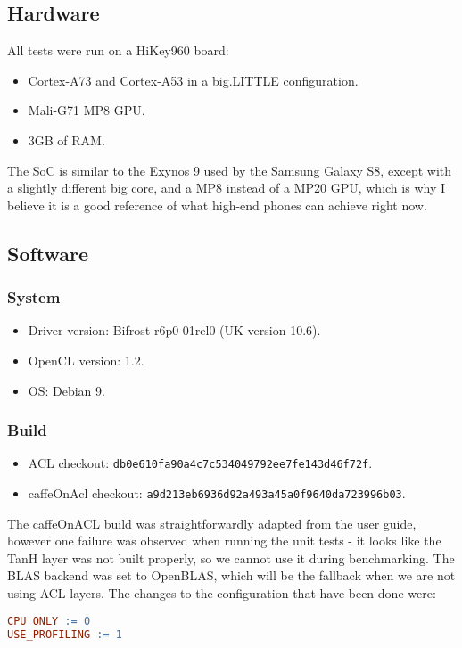 \documentclass[12pt, a4paper, notitlepage]{report}
\begin{document}
\subsection*{Hardware}
All tests were run on a HiKey960 board:
\begin{itemize}
\item Cortex-A73 and Cortex-A53 in a big.LITTLE configuration.
\item Mali-G71 MP8 GPU.
\item 3GB of RAM.
\end{itemize}
The SoC is similar to the Exynos 9 used by the Samsung Galaxy S8, except with a slightly different big core, and a MP8 instead of a MP20 GPU, which is why I believe it is a good reference of what high-end phones can achieve right now.\cite{galaxy}

\subsection*{Software}
\subsubsection*{System}
\begin{itemize}
	\item Driver version: Bifrost r6p0-01rel0 (UK version 10.6).
	\item OpenCL version: 1.2.
	\item OS: Debian 9.
\end{itemize}
\subsubsection*{Build}
\begin{itemize}
	\item ACL checkout: \texttt{db0e610fa90a4c7c534049792ee7fe143d46f72f}.
	\item caffeOnAcl checkout: \texttt{a9d213eb6936d92a493a45a0f9640da723996b03}.
\end{itemize}
The caffeOnACL build was straightforwardly adapted from the user guide, however one failure was observed when running the unit tests - it looks like the TanH layer was not built properly, so we cannot use it during benchmarking. The BLAS backend was set to OpenBLAS, which will be the fallback when we are not using ACL layers. The changes to the configuration that have been done were:
\begin{lstlisting}[language=make]
CPU_ONLY := 0
USE_PROFILING := 1
\end{lstlisting}
\end{document}
